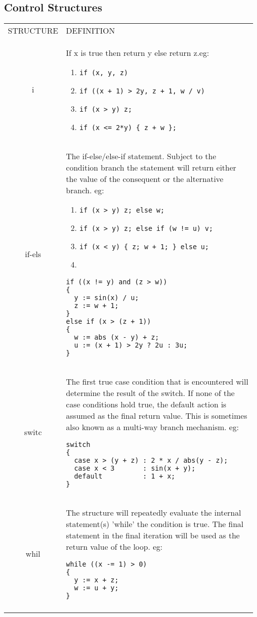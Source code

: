 \subsection{Control Structures}

\begin{tabular}{|c|p{}|}
\hline 
STRUCTURE  & DEFINITION\tabularnewline
i & If x is true then return y else return z.eg: 
\begin{enumerate}
\item \verb"if (x, y, z)" 
\item \verb"if ((x + 1) > 2y, z + 1, w / v)" 
\item \verb"if (x > y) z;" 
\item \verb"if (x <= 2*y) { z + w };" 
\end{enumerate}
\tabularnewline
if-els & The if-else/else-if statement. Subject to the condition branch the
statement will return either the value of the consequent or the alternative
branch. eg: 
\begin{enumerate}
\item \verb"if (x > y) z; else w;" 
\item \verb"if (x > y) z; else if (w != u) v;" 
\item \verb"if (x < y) { z; w + 1; } else u;" 
\item 
\end{enumerate}
\begin{verbatim}
if ((x != y) and (z > w))
{   
  y := sin(x) / u;
  z := w + 1;     
}                  
else if (x > (z + 1))
{                    
  w := abs (x - y) + z;
  u := (x + 1) > 2y ? 2u : 3u;
}
\end{verbatim}
\tabularnewline
switc & The first true case condition that is encountered will determine the
result of the switch. If none of the case conditions hold true, the
default action is assumed as the final return value. This is sometimes
also known as a multi-way branch mechanism. eg: 
\begin{verbatim}
switch                                                 
{                                                      
  case x > (y + z) : 2 * x / abs(y - z);               
  case x < 3       : sin(x + y);                       
  default          : 1 + x;                            
}            
\end{verbatim}
\tabularnewline
whil & The structure will repeatedly evaluate the internal statement(s) 'while'
the condition is true. The final statement in the final iteration
will be used as the return value of the loop. eg: 
\begin{verbatim}
while ((x -= 1) > 0)                                   
{                                                      
  y := x + z;                                          
  w := u + y;                                          
}               
\end{verbatim}
\tabularnewline
\hline 
 & \tabularnewline
\end{tabular}

